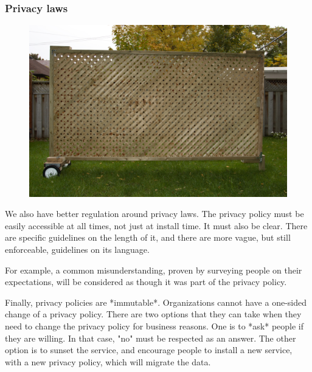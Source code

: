 \begin{frame}[fragile]
\frametitle{Privacy laws}

\begin{figure}
\includegraphics[scale=0.3]{screen}
\end{figure}

\end{frame}

We also have better regulation around privacy laws.
The privacy policy must be easily accessible at all times,
not just at install time.
It must also be clear.
There are specific guidelines on the length of it,
and there are more vague,
but still enforceable,
guidelines
on its language.

For example,
a common misunderstanding,
proven by surveying people on their expectations,
will be considered as though it was part of the privacy policy.

Finally,
privacy policies are *immutable*.
Organizations cannot have a one-sided change of a privacy policy.
There are two options that they can take when they need to change
the privacy policy for business reasons.
One is to *ask* people if they are willing.
In that case,
"no"
must be respected as an answer.
The other option is to sunset the service,
and encourage people to install a new service,
with a new privacy policy,
which will migrate the data.

